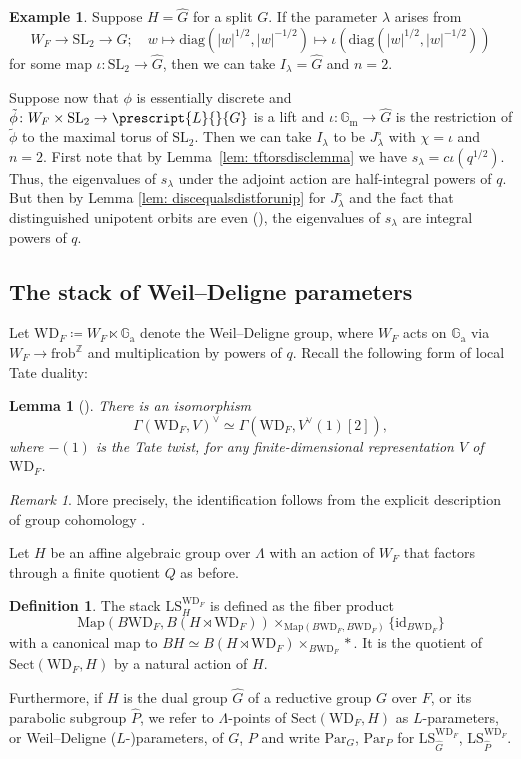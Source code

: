 \documentclass{amsart}
\newtheorem{lemma}[theorem]{Lemma}
\theoremstyle{definition}
\newtheorem{definition}[theorem]{Definition}
\newtheorem{example}[theorem]{Example}
\theoremstyle{remark}
\newtheorem{remark}[theorem]{Remark}
\numberwithin{equation}{section}
\newcommand{\Z}{\mathbb{Z}}
\newcommand{\SL}{\mathrm{SL}}
\newcommand{\Gm}{{\mathbb{G}_{\mathrm{m}}}}
\newcommand{\co}[1]{\prescript{#1}{}}
\newcommand{\wh}{\widehat}
\newcommand{\frob}{\mathrm{frob}}
\newcommand{\Par}{\mathrm{Par}}
\newcommand{\diag}{\mathrm{diag}}
\newcommand{\id}{\mathrm{id}}
\newcommand{\WD}{\mathrm{WD}}
\newcommand{\Ga}{\mathbb{G}_{\mathrm{a}}}
\newcommand{\Map}{\mathrm{Map}}
\newcommand{\LS}{\mathrm{LS}}
\newcommand{\Sect}{\mathrm{Sect}}
\begin{document}
\begin{example}{\label{ex: Ilambda}}
Suppose $H=\wh G$ for a split $G$. If the parameter $\lambda$ arises from
\[
W_F\to \SL_2 \to \wh G;\quad w \mapsto \diag (\lvert w\rvert^{1/2}, \lvert w\rvert^{-1/2}) \mapsto \iota (\diag (\lvert w\rvert^{1/2}, \lvert w\rvert^{-1/2}))
\]
for some map $\iota\colon \SL_2\to \wh G$, then we can take $I_\lambda=\wh G$ and $n=2$.

Suppose now that $\phi$ is essentially discrete and $\tilde{\phi}\colon W_F \times \SL_2 \rightarrow \co{L}{G}$ is a lift and $\iota: \Gm \rightarrow \wh{G}$ is the restriction of $\tilde{\phi}$ to the maximal torus of $\SL_2$. Then we can take $I_{\lambda}$ to be $J^{\circ}_{\lambda}$ with $\chi = \iota$ and $n=2$. First note that by Lemma~\ref{lem: tftorsdisclemma} we have $s_{\lambda} = c\iota(q^{1/2})$. Thus, the eigenvalues of $s_{\lambda}$ under the adjoint action are half-integral powers of $q$. But then by Lemma \ref{lem: discequalsdistforunip} for $J^{\circ}_{\lambda}$ and the fact that distinguished unipotent orbits are even (\cite[Theorem 8.2.3]{CollingWoodMcGovern}), the eigenvalues of $s_{\lambda}$ are integral powers of $q$.
\end{example}

\subsection{The stack of Weil--Deligne parameters}
Let $\WD_F\coloneq W_F \ltimes \Ga$ denote the Weil--Deligne group, where $W_F$ acts on $\Ga$ via $W_F\to \frob^\Z$ and multiplication by powers of $q$. Recall the following form of local Tate duality:

\begin{lemma}[{\cite[Corollary 4.9]{takayalin}}]\label{lem: localTateDuality}
There is an isomorphism
\[
\Gamma (\WD_F, V)^{\vee} \simeq \Gamma(\WD_F, V^{\vee}(1)[2]),
\]
where $-(1)$ is the Tate twist, for any finite-dimensional representation $V$ of $\WD_F$. 
\end{lemma}

\begin{remark}
More precisely, the identification follows from the explicit description of group cohomology \cite[Proposition B.6]{takayalin}. 
\end{remark}


Let $H$ be an affine algebraic group over $\Lambda$ with an action of $W_F$ that factors through a finite quotient $Q$ as before.

\begin{definition}
The stack $\LS_H^{\WD_F}$ is defined as the fiber product
\[
\Map (B\WD_F, B(H\rtimes \WD_F))\times_{\Map (B\WD_F, B\WD_F)}\{\id_{B\WD_F} \}
\]
with a canonical map to $BH\simeq B(H\rtimes \WD_F) \times_{B\WD_F}*$. It is the quotient of $\Sect(\WD_F, H)$ by a natural action of $H$. 


Furthermore, if $H$ is the dual group $\wh{G}$ of a reductive group $G$ over $F$, or its parabolic subgroup $\wh P$, we refer to $\Lambda$-points of $\Sect(\WD_F, H)$ as $L$-parameters, or Weil--Deligne ($L$-)parameters, of $G$, $P$ and write $\Par_G$, $\Par_P$ for $\LS_{\wh G}^{\WD_F}$, $\LS_{\wh P}^{\WD_F}$.
\end{definition} 
\end{document}
